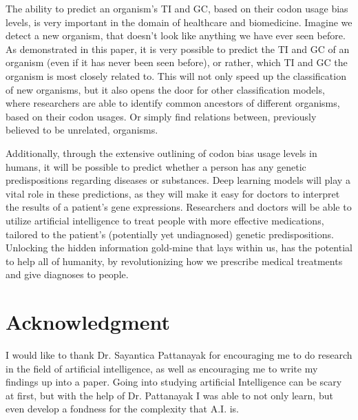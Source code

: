 \documentclass[conference]{IEEEtran}
\begin{document}

The ability to predict an organism's TI and GC, based on their codon usage bias levels, is very important in the domain of healthcare and biomedicine. Imagine we detect a new organism, that doesn't look like anything we have ever seen before. As demonstrated in this paper, it is very possible to predict the TI and GC of an organism (even if it has never been seen before), or rather, which TI and GC the organism is most closely related to. This will not only speed up the classification of new organisms, but it also opens the door for other classification models, where researchers are able to identify common ancestors of different organisms, based on their codon usages. Or simply find relations between, previously believed to be unrelated, organisms.

Additionally, through the extensive outlining of codon bias usage levels in humans, it will be possible to predict whether a person has any genetic predispositions regarding diseases or substances. Deep learning models will play a vital role in these predictions, as they will make it easy for doctors to interpret the results of a patient's gene expressions. Researchers and doctors will be able to utilize artificial intelligence to treat people with more effective medications, tailored to the patient's (potentially yet undiagnosed) genetic predispositions. Unlocking the hidden information gold-mine that lays within us, has the potential to help all of humanity, by revolutionizing how we prescribe medical treatments and give diagnoses to people.  




\section*{Acknowledgment}
I would like to thank Dr. Sayantica Pattanayak for encouraging me to do research in the field of artificial intelligence, as well as encouraging me to write my findings up into a paper. Going into studying artificial Intelligence can be scary at first, but with the help of Dr. Pattanayak I was able to not only learn, but even develop a fondness for the complexity that A.I. is. 
\end{document}
